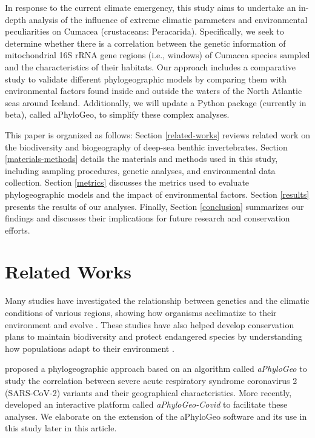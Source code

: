 In response to the current climate emergency, this study aims to undertake an in-depth analysis of the influence of extreme climatic parameters and environmental peculiarities on Cumacea (crustaceans: Peracarida). Specifically, we seek to determine whether there is a correlation between the genetic information of mitochondrial 16S rRNA gene regions (i.e., windows) of Cumacea species sampled and the characteristics of their habitats. Our approach includes a comparative study to validate different phylogeographic models by comparing them with environmental factors found inside and outside the waters of the North Atlantic seas around Iceland. Additionally, we will update a Python package (currently in beta), called aPhyloGeo, to simplify these complex analyses.

This paper is organized as follows: Section \autoref{related-works} reviews related work on the biodiversity and biogeography of deep-sea benthic invertebrates. Section \autoref{materials-methods} details the materials and methods used in this study, including sampling procedures, genetic analyses, and environmental data collection. Section \autoref{metrics} discusses the metrics used to evaluate phylogeographic models and the impact of environmental factors. Section \autoref{results} presents the results of our analyses. Finally, Section \autoref{conclusion} summarizes our findings and discusses their implications for future research and conservation efforts.

\section{Related Works}\label{related-works}
Many studies have investigated the relationship between genetics and the climatic conditions of various regions, showing how organisms acclimatize to their environment and evolve \citep{fc_genomic_2012}. These studies have also helped develop conservation plans to maintain biodiversity and protect endangered species by understanding how populations adapt to their environment \citep{balkenhol_identifying_2009}.

\cite{koshkarov_phylogeography_2022} proposed a phylogeographic approach based on an algorithm called \textit{aPhyloGeo} to study the correlation between severe acute respiratory syndrome coronavirus 2 (SARS-CoV-2) variants and their geographical characteristics. More recently, \cite{li_aphylogeo-covid_2023} developed an interactive platform called \textit{aPhyloGeo-Covid} to facilitate these analyses. We elaborate on the extension of the aPhyloGeo software and its use in this study later in this article.

